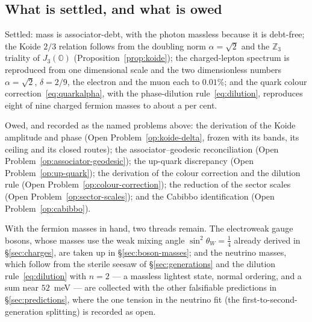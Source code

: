 \subsection{What is settled, and what is owed}

Settled: mass is associator-debt, with the photon massless because it is debt-free; the Koide $2/3$
relation follows from the doubling norm $\alpha=\sqrt2$ and the $\mathbb{Z}_3$ triality of $J_3(\mathbb{O})$
(Proposition~\ref{prop:koide}); the charged-lepton spectrum is reproduced from one dimensional scale
and the two dimensionless numbers $\alpha=\sqrt2$, $\delta=2/9$, the electron and the muon each to
$0.01\%$; and the quark colour correction~\eqref{eq:quarkalpha}, with the phase-dilution
rule~\eqref{eq:dilution}, reproduces eight of nine charged fermion masses to about a per cent.

Owed, and recorded as the named problems above: the derivation of the Koide amplitude and phase
(Open Problem~\ref{op:koide-delta}, frozen with its bands, its ceiling and its closed routes);
the associator--geodesic
reconciliation (Open Problem~\ref{op:associator-geodesic}); the up-quark discrepancy
(Open Problem~\ref{op:up-quark}); the derivation of the colour correction and the dilution rule
(Open Problem~\ref{op:colour-correction}); the reduction of the sector scales
(Open Problem~\ref{op:sector-scales}); and the Cabibbo identification
(Open Problem~\ref{op:cabibbo}).

With the fermion masses in hand, two threads remain. The electroweak gauge bosons, whose masses use
the weak mixing angle $\sin^2\theta_W = \tfrac14$ already derived in \S\ref{sec:charges}, are taken
up in \S\ref{sec:boson-masses}; and the neutrino masses, which follow from the sterile seesaw of
\S\ref{sec:generations} and the dilution rule~\eqref{eq:dilution} with $n = 2$ --- a massless
lightest state, normal ordering, and a sum near $52$~meV --- are collected with the other
falsifiable predictions in \S\ref{sec:predictions}, where the one tension in the neutrino fit (the
first-to-second-generation splitting) is recorded as open.
